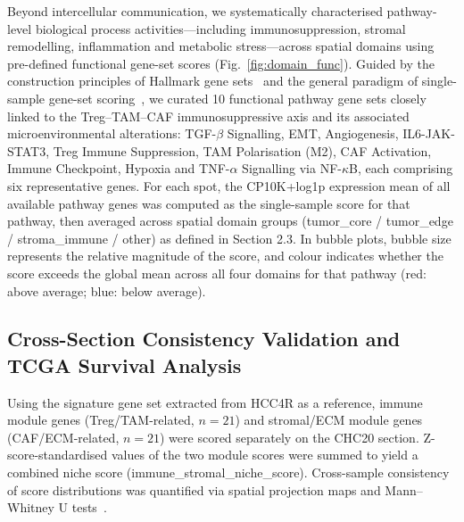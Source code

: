 \documentclass[12pt, a4paper]{article}
\begin{document}
Beyond intercellular communication, we systematically characterised pathway-level biological process activities---including immunosuppression, stromal remodelling, inflammation and metabolic stress---across spatial domains using pre-defined functional gene-set scores (Fig.~\ref{fig:domain_func}). Guided by the construction principles of Hallmark gene sets~\citep{liberzon2015molecular} and the general paradigm of single-sample gene-set scoring~\citep{barbie2009systematic}, we curated 10 functional pathway gene sets closely linked to the Treg--TAM--CAF immunosuppressive axis and its associated microenvironmental alterations: TGF-$\beta$ Signalling, EMT, Angiogenesis, IL6-JAK-STAT3, Treg Immune Suppression, TAM Polarisation (M2), CAF Activation, Immune Checkpoint, Hypoxia and TNF-$\alpha$ Signalling via NF-$\kappa$B, each comprising six representative genes. For each spot, the CP10K+log1p expression mean of all available pathway genes was computed as the single-sample score for that pathway, then averaged across spatial domain groups (tumor\_core / tumor\_edge / stroma\_immune / other) as defined in Section 2.3. In bubble plots, bubble size represents the relative magnitude of the score, and colour indicates whether the score exceeds the global mean across all four domains for that pathway (red: above average; blue: below average).

\subsection{Cross-Section Consistency Validation and TCGA Survival Analysis}

Using the signature gene set extracted from HCC4R as a reference, immune module genes (Treg/TAM-related, $n = 21$) and stromal/ECM module genes (CAF/ECM-related, $n = 21$) were scored separately on the CHC20 section. Z-score-standardised values of the two module scores were summed to yield a combined niche score (immune\_stromal\_niche\_score). Cross-sample consistency of score distributions was quantified via spatial projection maps and Mann--Whitney U tests~\citep{mann1947test}.
\end{document}
